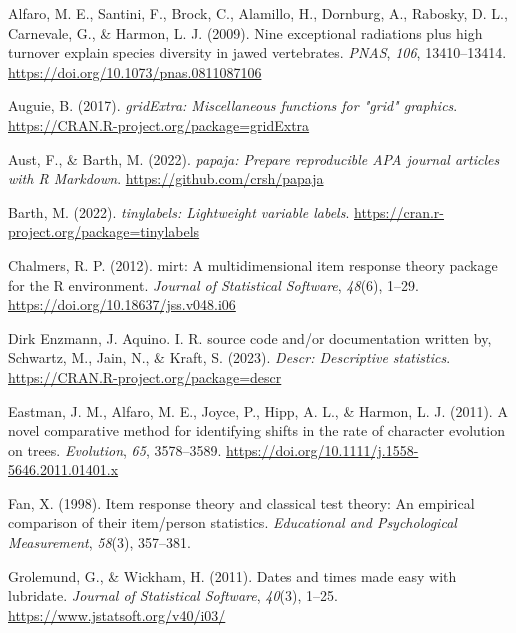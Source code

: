 \documentclass[
  jou]{apa6}
\newlength{\cslhangindent}
\newlength{\cslentryspacingunit} %
\newenvironment{CSLReferences}[2] %
 {%
  \setlength{\parindent}{0pt}
  \ifodd #1
  \let\oldpar\par
  \def\par{\hangindent=\cslhangindent\oldpar}
  \fi
  \setlength{\parskip}{#2\cslentryspacingunit}
 }%
 {}
\begin{document}
\begingroup
\setlength{\parindent}{-0.5in}
\setlength{\leftskip}{0.5in}

\hypertarget{refs}{}
\begin{CSLReferences}{1}{0}
\leavevmode{}%
Alfaro, M. E., Santini, F., Brock, C., Alamillo, H., Dornburg, A., Rabosky, D. L., Carnevale, G., \& Harmon, L. J. (2009). Nine exceptional radiations plus high turnover explain species diversity in jawed vertebrates. \emph{PNAS}, \emph{106}, 13410--13414. \url{https://doi.org/10.1073/pnas.0811087106}

\leavevmode{}%
Auguie, B. (2017). \emph{gridExtra: Miscellaneous functions for "grid" graphics}. \url{https://CRAN.R-project.org/package=gridExtra}

\leavevmode{}%
Aust, F., \& Barth, M. (2022). \emph{{papaja}: {Prepare} reproducible {APA} journal articles with {R Markdown}}. \url{https://github.com/crsh/papaja}

\leavevmode{}%
Barth, M. (2022). \emph{{tinylabels}: Lightweight variable labels}. \url{https://cran.r-project.org/package=tinylabels}

\leavevmode{}%
Chalmers, R. P. (2012). {mirt}: A multidimensional item response theory package for the {R} environment. \emph{Journal of Statistical Software}, \emph{48}(6), 1--29. \url{https://doi.org/10.18637/jss.v048.i06}

\leavevmode{}%
Dirk Enzmann, J. Aquino. I. R. source code and/or documentation written by, Schwartz, M., Jain, N., \& Kraft, S. (2023). \emph{Descr: Descriptive statistics}. \url{https://CRAN.R-project.org/package=descr}

\leavevmode{}%
Eastman, J. M., Alfaro, M. E., Joyce, P., Hipp, A. L., \& Harmon, L. J. (2011). A novel comparative method for identifying shifts in the rate of character evolution on trees. \emph{Evolution}, \emph{65}, 3578--3589. \url{https://doi.org/10.1111/j.1558-5646.2011.01401.x}

\leavevmode{}%
Fan, X. (1998). Item response theory and classical test theory: An empirical comparison of their item/person statistics. \emph{Educational and Psychological Measurement}, \emph{58}(3), 357--381.

\leavevmode{}%
Grolemund, G., \& Wickham, H. (2011). Dates and times made easy with {lubridate}. \emph{Journal of Statistical Software}, \emph{40}(3), 1--25. \url{https://www.jstatsoft.org/v40/i03/}


\end{CSLReferences}
\end{document}
